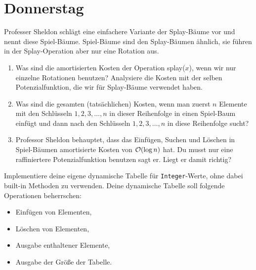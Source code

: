 \documentclass{uebung_cs}
\begin{document}
\section*{Donnerstag}

\begin{aufgabe}[Splay-Bäume]
	Professer Sheldon schlägt eine einfachere Variante der Splay-Bäume vor und nennt diese Spiel-Bäume. Spiel-Bäume sind den Splay-Bäumen ähnlich, sie führen in der Splay-Operation aber nur eine Rotation aus. 
	\begin{enumerate}
		\item Was sind die amortisierten Kosten der Operation splay($x$), wenn wir nur einzelne Rotationen benutzen? Analysiere die Kosten mit der selben Potenzialfunktion, die wir für Splay-Bäume verwendet haben.\\
		\item Was sind die gesamten (tatsächlichen) Kosten, wenn man zuerst $n$ Elemente mit den Schlüsseln $1,2,3,\dots,n$ in dieser Reihenfolge in einen Spiel-Baum einfügt und dann nach den Schlüsseln $1,2,3,\dots,n$ in diese Reihenfolge sucht?\\
		\item Professor Sheldon behauptet, dass das Einfügen, Suchen und Löschen in Spiel-Bäumen amortisierte Kosten von $\mathcal{O}(\log n)$ hat. \glqq Du musst nur eine raffiniertere Potenzialfunktion benutzen \grqq{,} sagt er. Liegt er damit richtig?
	\end{enumerate}
\end{aufgabe}

\begin{aufgabe}
	Implementiere deine eigene dynamische Tabelle für \texttt{Integer}-Werte, ohne dabei built-in Methoden zu verwenden. Deine dynamische Tabelle soll folgende Operationen beherrschen:
	\begin{itemize}
		\item Einfügen von Elementen, \\
		\item Löschen von Elementen, \\
		\item Ausgabe enthaltener Elemente, \\
		\item Ausgabe der Größe der Tabelle.
	\end{itemize}
\end{aufgabe}
\end{document}
